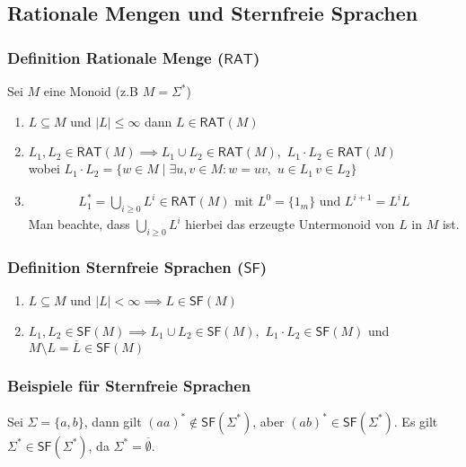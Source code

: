 \documentclass[12pt, german]{article}
\newcommand{\sigstern}{\Sigma^\ast}
\newcommand{\rat}{\mathsf{RAT}}
\newcommand{\starfree}{\mathsf{SF}}
\begin{document}
	\subsection{Rationale Mengen und Sternfreie Sprachen}
	\subsubsection{Definition Rationale Menge ($\rat$)}
	Sei $M$ eine Monoid (z.B $M = \sigstern$) 
	\begin{enumerate}[label=\arabic*)]
		\item $L \subseteq M $ und $ |L| \leq \infty$ dann $L \in \rat(M)$
		\item $L_1, L_2 \in \rat(M) \implies L_1 \cup L_2 \in \rat(M), \, \, L_1 \cdot L_2 \in \rat(M)$ \\ 
		wobei $ L_1 \cdot L_2 = \{w \in M \mid \exists u,v \in M : w = uv, \, \, u \in L_1 \, v \in L_2\}$
		\item
		\begin{align*}
			L_1^\ast = \bigcup_{i \geq 0} L^i \in \rat(M) \text{ mit } L^0=\{1_m\} \text{ und } L^{i+1} = L^iL
		\end{align*}
		Man beachte, dass $\bigcup_{i \geq 0} L^i $ hierbei das erzeugte Untermonoid von $L$ in $M$ ist.
	\end{enumerate}
	
	
	\subsubsection{Definition Sternfreie Sprachen ($\starfree$)}
	\begin{enumerate}[label=\arabic*)]
		\item $L \subseteq M $ und $ |L| < \infty \implies L \in \starfree(M)$
		\item $L_1, L_2 \in \starfree(M) \implies L_1 \cup L_2 \in \starfree(M), \, \, L_1 \cdot L_2 \in \starfree(M)$  und $M \setminus L = \overline{L} \in \starfree(M)$\\ 
	\end{enumerate}
	
	\subsubsection{Beispiele für Sternfreie Sprachen}
	Sei $\Sigma = \{a,b\}$, dann gilt $(aa)^\ast \not\in \starfree(\sigstern)$, aber $(ab)^\ast \in \starfree(\sigstern)$. Es gilt $\sigstern \in \starfree(\sigstern)$, da $\sigstern = \overline{\emptyset}$. 
	\newline
	
\end{document}
